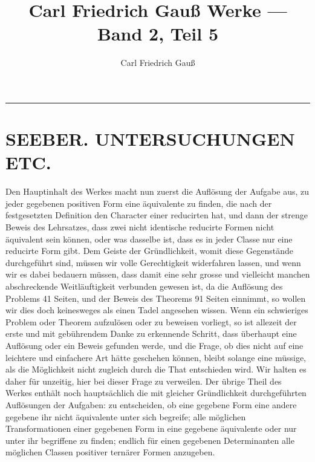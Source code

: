 \documentclass[12pt,a4paper]{article}
\title{Carl Friedrich Gau{\ss} Werke --- Band 2, Teil 5}
\author{Carl Friedrich Gau{\ss}}
\date{}
\begin{document}
\maketitle
\thispagestyle{fancy}

\noindent\rule{\textwidth}{0.5pt}

\section*{SEEBER. UNTERSUCHUNGEN ETC.}

Den Hauptinhalt des Werkes macht nun zuerst die Aufl\"{o}sung der Aufgabe aus, zu jeder gegebenen positiven Form eine \"{a}quivalente zu finden, die nach der festgesetzten Definition den Character einer reducirten hat, und dann der strenge Beweis des Lehrsatzes, dass zwei nicht identische reducirte Formen nicht \"{a}quivalent sein k\"{o}nnen, oder was dasselbe ist, dass es in jeder Classe nur eine reducirte Form gibt. Dem Geiste der Gr\"{u}ndlichkeit, womit diese Gegenst\"{a}nde durchgef\"{u}hrt sind, m\"{u}ssen wir volle Gerechtigkeit widerfahren lassen, und wenn wir es dabei bedauern m\"{u}ssen, dass damit eine sehr grosse und vielleicht manchen abschreckende Weitl\"{a}uftigkeit verbunden gewesen ist, da die Aufl\"{o}sung des Problems 41 Seiten, und der Beweis des Theorems 91 Seiten einnimmt, so wollen wir dies doch keinesweges als einen Tadel angesehen wissen. Wenn ein schwieriges Problem oder Theorem aufzul\"{o}sen oder zu beweisen vorliegt, so ist allezeit der erste und mit geb\"{u}hrendem Danke zu erkennende Schritt, dass \"{u}berhaupt eine Aufl\"{o}sung oder ein Beweis gefunden werde, und die Frage, ob dies nicht auf eine leichtere und einfachere Art h\"{a}tte geschehen k\"{o}nnen, bleibt solange eine m\"{u}ssige, als die M\"{o}glichkeit nicht zugleich durch die That entschieden wird. Wir halten es daher f\"{u}r unzeitig, hier bei dieser Frage zu verweilen. Der \"{u}brige Theil des Werkes enth\"{a}lt noch haupts\"{a}chlich die mit gleicher Gr\"{u}ndlichkeit durchgef\"{u}hrten Aufl\"{o}sungen der Aufgaben: zu entscheiden, ob eine gegebene Form eine andere gegebene ihr nicht \"{a}quivalente unter sich begreife; alle m\"{o}glichen Transformationen einer gegebenen Form in eine gegebene \"{a}quivalente oder nur unter ihr begriffene zu finden; endlich f\"{u}r einen gegebenen Determinanten alle m\"{o}glichen Classen positiver tern\"{a}rer Formen anzugeben.
\end{document}
